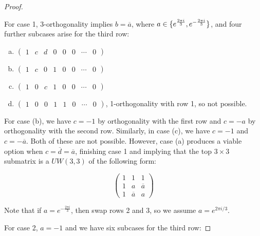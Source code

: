 \begin{lemma}
\begin{proof}
\begin{myind}{1cm}
   For case 1, 3-orthogonality implies $b = \overline{a}$, where $a \in \{e^{\frac{2\pi i}{3}},e^{-\frac{2\pi i}{3}}\}$, and four further subcases arise for the third row:

    \begin{enumerate}[(a)]
     \item  $
      \left(
       \begin{array}{cccccccc}
         1 & c  & d &0 &0&0 &\dotsb &0
       \end{array}
      \right)
      $
    \item $
      \left(
       \begin{array}{cccccccc}
         1 & c  & 0 &1 &0 &0 &\dotsb &0
       \end{array}
      \right)
      $
    \item $
      \left(
       \begin{array}{cccccccc}
         1 & 0  & c &1 &0 &0&\dotsb &0
       \end{array}
      \right)
      $
    \item $
      \left(
       \begin{array}{cccccccc}
         1 & 0  & 0 &1 &1 &0&\dotsb &0
       \end{array}
      \right)
      $, 1-orthogonality with row 1, so not possible.
    \end{enumerate}
  
    For case (b), we have $c = -1$ by orthogonality with the first row and $c = -a$ by orthogonality with the second row. Similarly, in case (c), we have $c = -1$ and $c = -\overline{a}$. Both of these are not possible. However, case (a) produces a viable option when $c=\overline{d}=\overline{a}$, finishing case 1 and implying that the top $3\times3$ submatrix is a $UW(3,3)$ of the following form:

$$
\left(
\begin{array}{ccc}
 1 & 1       &1 \\
 1 & a       &\overline{a} \\
 1 & \overline{a} &a       
\end{array}
\right)
$$

Note that if $a=e^{-\frac{2\pi i}{3}}$, then swap rows 2 and 3, so we assume $a=e^{{2\pi i}/{3}}$.

\end{myind}

    For case 2, $a=-1$ and we have six subcases for the third row:


\end{proof}
\end{lemma}
